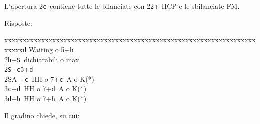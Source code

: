 \documentclass[a4paper,italian]{article}
\newcommand{\BS}{\small{\texttt{S}}}
\newcommand{\BC}{\small{\texttt{c}}}
\newcommand{\BD}{\small{\texttt{d}}}
\newcommand{\BH}{\small{\texttt{h}}}
\newenvironment{bidtable}
{\begin{tabbing}

    xxxxxx\=xxxxxxxxx\=xxxxxxxxx\=xxxxxxx\=xxxxxxx\=xxxxxxx\=xxxxxxx\=xxxxxxx\=xxxxxxx\=xxxxxxx\=\kill}
{\end{tabbing} }%
\newenvironment{varie}[1]
{\begin{tcolorbox}[colframe=green!40!black,title=#1]}
    {
\end{tcolorbox} }%
\begin{document}
\begin{multicols}{2}

    L'apertura 2\BC\ contiene tutte le bilanciate con 22+ HCP e le sbilanciate FM.

    Risposte:

    \begin{bidtable}
        2\BD \> Waiting o 5+\BH \\
        2\BH {}+\BS\ dichiarabili o max\\
        2\BS {}+\BC 5+\BD \\
        2\small{SA} +\BC\ HH o 7+\BC\ A o K(*)\\
        3\BC {}+\BD\ HH o 7+\BD\ A o K(*)\\
        3\BD {}+\BH\ HH o 7+\BH\ A o K(*)
    \end{bidtable}
    \begin{varie}{(*) Relay richiesta onori}

        Il gradino chiede, su cui:


\end{varie}
\end{multicols}
\end{document}
